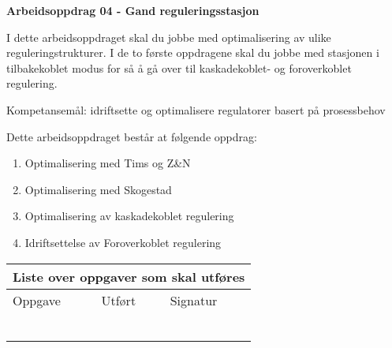 
\noindent
{\bf Arbeidsoppdrag 04 - Gand reguleringsstasjon}

I dette arbeidsoppdraget skal du jobbe med optimalisering av ulike reguleringstrukturer. I de to første oppdragene skal du jobbe med stasjonen i tilbakekoblet modus for så å gå over til kaskadekoblet- og foroverkoblet regulering. 

\vskip 5pt
Kompetansemål:
idriftsette og optimalisere regulatorer basert på prosessbehov

Dette arbeidsoppdraget består at følgende oppdrag:
\begin{enumerate}
	\item Optimalisering med Tims og Z\&N 
	\item Optimalisering med Skogestad
	\item Optimalisering av kaskadekoblet regulering
	\item Idriftsettelse av Foroverkoblet regulering
\end{enumerate}

\begin{center}
\begin{tabular}{ | m{8cm} | m{1cm}| m{2cm} | } 
\hline
\multicolumn{3}{|c|}{Liste over oppgaver som skal utføres} \\
	\hline
	Oppgave	& Utført & Signatur \\ 
	\hline
	\hline
	& & \\ 
	\hline
	& & \\ 
	\hline
	& & \\ 
	\hline
	& & \\ 
	\hline
	& & \\ 
	\hline
	& & \\ 
	\hline
\end{tabular}
\end{center}


